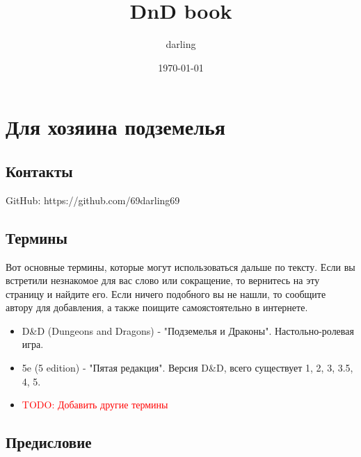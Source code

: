 \documentclass[10pt,a4paper]{book}
\title{DnD book}
\author{darling}
\date{\today}
\newcommand{\TODO}[1]{\textcolor{red}{TODO: #1}}
\begin{document}
	\maketitle
	\tableofcontents
	\newpage
	\chapter{Для хозяина подземелья}
		\section{Контакты}
			GitHub: https://github.com/69darling69
		
		\section{Термины}
			Вот основные термины, которые могут использоваться дальше по тексту. Если вы встретили незнакомое для вас слово или сокращение, то вернитесь на эту страницу и найдите его. Если ничего подобного вы не нашли, то сообщите автору для добавления, а также поищите самоястоятельно в интернете.
			\begin{itemize}
				\item D\&D (Dungeons and Dragons) - "Подземелья и Драконы". Настольно-ролевая игра.
				\item 5e (5 edition) - "Пятая редакция". Версия D\&D, всего существует 1, 2, 3, 3.5, 4, 5.
				\item \TODO{Добавить другие термины}
			\end{itemize}
	
		\section{Предисловие}
		
\end{document}
